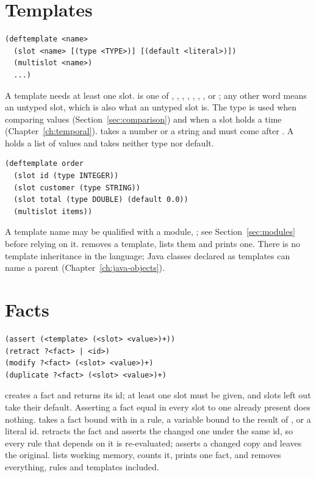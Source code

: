 \section{Templates}
\label{sec:templates}

\begin{lstlisting}
(deftemplate <name>
  (slot <name> [(type <TYPE>)] [(default <literal>)])
  (multislot <name>)
  ...)
\end{lstlisting}

A template needs at least one slot.  is one of ,
, , , , , ,
 or ; any other word means an untyped 
slot, which is also what an untyped slot is. The type is used when
comparing values (Section~\ref{sec:comparison}) and when a slot holds a
time (Chapter~\ref{ch:temporal}).  takes a number or a string
and must come after . A  holds a list of values and
takes neither type nor default.

\begin{lstlisting}
(deftemplate order
  (slot id (type INTEGER))
  (slot customer (type STRING))
  (slot total (type DOUBLE) (default 0.0))
  (multislot items))
\end{lstlisting}

A template name may be qualified with a module, ; see Section~\ref{sec:modules} before relying on it.
 removes a template,  lists them
and  prints one. There is no template
inheritance in the language; Java classes declared as templates can name
a parent (Chapter~\ref{ch:java-objects}).

\section{Facts}
\label{sec:facts}

\begin{lstlisting}
(assert (<template> (<slot> <value>)+))
(retract ?<fact> | <id>)
(modify ?<fact> (<slot> <value>)+)
(duplicate ?<fact> (<slot> <value>)+)
\end{lstlisting}

 creates a fact and returns its id; at least one slot must be
given, and slots left out take their default. Asserting a fact equal in
every slot to one already present does nothing.  takes a fact
bound with  in a rule, a variable bound to the result of
, or a literal id.  retracts the fact and asserts
the changed one under the same id, so every rule that depends on it is
re-evaluated;  asserts a changed copy and leaves the
original.  lists working memory,  counts it,
 prints one fact, and  removes everything,
rules and templates included.

